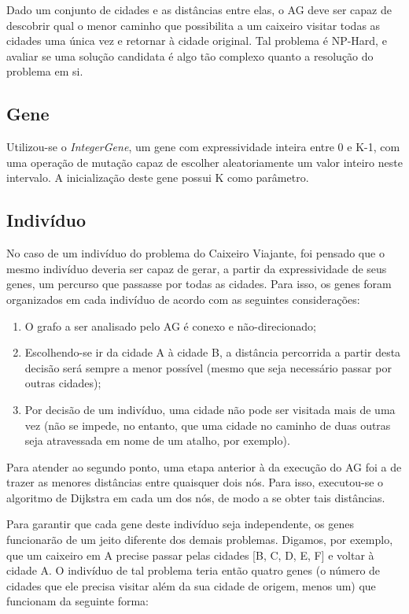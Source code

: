 Dado um conjunto de cidades e as distâncias entre elas, o AG deve ser capaz de descobrir qual o menor caminho que possibilita a um caixeiro visitar todas as cidades uma única vez e retornar à cidade original. Tal problema é NP-Hard, e avaliar se uma solução candidata é algo tão complexo quanto a resolução do problema em si.

\subsection*{Gene}

Utilizou-se o \emph{IntegerGene}, um gene com expressividade inteira entre 0 e K-1, com uma operação de mutação capaz de escolher aleatoriamente um valor inteiro neste intervalo. A inicialização deste gene possui K como parâmetro.

\subsection*{Indivíduo}

No caso de um indivíduo do problema do Caixeiro Viajante, foi pensado que o mesmo indivíduo deveria ser capaz de gerar, a partir da expressividade de seus genes, um percurso que passasse por todas as cidades. Para isso, os genes foram organizados em cada indivíduo de acordo com as seguintes considerações:

\begin{enumerate}[label={(\arabic*)}]
	\item O grafo a ser analisado pelo AG é conexo e não-direcionado;
	\item Escolhendo-se ir da cidade A à cidade B, a distância percorrida a partir desta decisão será sempre a menor possível (mesmo que seja necessário passar por outras cidades);
	\item Por decisão de um indivíduo, uma cidade não pode ser visitada mais de uma vez (não se impede, no entanto, que uma cidade no caminho de duas outras seja atravessada em nome de um atalho, por exemplo).
\end{enumerate}

Para atender ao segundo ponto, uma etapa anterior à da execução do AG foi a de trazer as menores distâncias entre quaisquer dois nós. Para isso, executou-se o algoritmo de Dijkstra \cite{dijkstra1959note} em cada um dos nós, de modo a se obter tais distâncias.

Para garantir que cada gene deste indivíduo seja independente, os genes funcionarão de um jeito diferente dos demais problemas. Digamos, por exemplo, que um caixeiro em A precise passar pelas cidades [B, C, D, E, F] e voltar à cidade A. O indivíduo de tal problema teria então quatro genes (o número de cidades que ele precisa visitar além da sua cidade de origem, menos um) que funcionam da seguinte forma:

